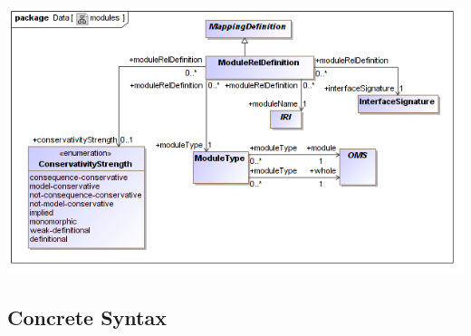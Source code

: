 \documentclass[10pt,fleqn,final]{scrreprt}
\newcommand{\ssclause}[1]{\subsection{#1}}
\newenvironment{definitions}[0]{\medskip }{}
\begin{document}
\begin{definitions}
\begin{center}
\includegraphics[scale=0.47]{mof/modules.png}
\end{center}






\ssclause{Concrete Syntax}\label{a:dol-text:mappings}

\vspace{-2em}
\begin{lstlisting}[language=ebnf,mathescape]


\end{lstlisting}
\end{definitions}
\end{document}
